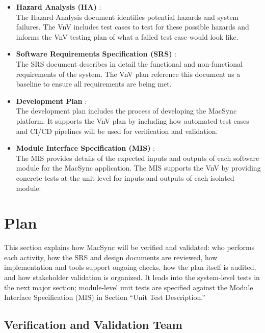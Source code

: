\documentclass[12pt, titlepage]{article}
\begin{document}
\begin{itemize}
    \item \textbf{Hazard Analysis (HA)} \citet{SL-HA}:\\
    The Hazard Analysis document identifies potential hazards and system failures. The VnV includes test cases to test for these possible hazards and informs the VnV testing plan of what a failed test case would look like.
    \item \textbf{Software Requirements Specification (SRS)} \citet{SL-SRS}:  \\
    The SRS document describes in detail the functional and non-functional requirements of the system. The VnV plan reference this document as a baseline to ensure all requirements are being met.
    \item \textbf{Development Plan} \citet{SL-DEVPLAN}:\\
    The development plan includes the process of developing the MacSync platform. It supports the VnV plan by including how automated test cases and CI/CD pipelines will be used for verification and validation.
    \item \textbf{Module Interface Specification (MIS) } \citet{SL-MIS}:\\
    The MIS provides details of the expected inputs and outputs of each software module for the MacSync application. The MIS supports the VnV by providing concrete tests at the unit level for inputs and outputs of each isolated module.
\end{itemize}

\section{Plan}

This section explains how MacSync will be verified and validated: who performs each activity, how the SRS and design documents are reviewed, how implementation and tools support ongoing checks, how the plan itself is audited, and how stakeholder validation is organized. It leads into the system-level tests in the next major section; module-level unit tests are specified against the Module Interface Specification (MIS) \citet{SL-MIS} in Section ``Unit Test Description.''

\subsection{Verification and Validation Team}
\end{document}
